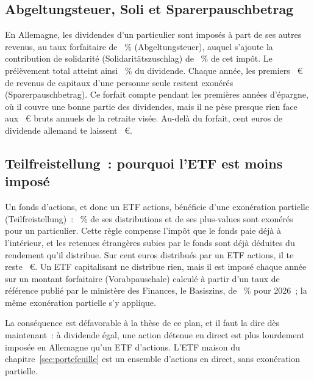 \subsection{Abgeltungsteuer, Soli et Sparerpauschbetrag}\label{sec:fisc-abgeltung}

En Allemagne, les dividendes d'un particulier sont impos\'es \`a part de ses autres revenus, au taux
forfaitaire de \AbgeltungSatz~\% (Abgeltungsteuer), auquel s'ajoute la
contribution de solidarit\'e (Solidarit\"atszuschlag) de \SoliSatz~\% de cet imp\^ot. Le
pr\'el\`evement total atteint ainsi \SteuerSatzGesamt~\% du dividende. Chaque ann\'ee, les premiers
\Sparerpauschbetrag~€ de revenus de capitaux d'une personne seule restent exon\'er\'es
(Sparerpauschbetrag). Ce forfait compte pendant les premi\`eres ann\'ees
d'\'epargne, o\`u il couvre une bonne partie des dividendes, mais il ne p\`ese presque rien face aux
\BruttoNoetig~€ bruts annuels de la retraite vis\'ee. Au-del\`a du forfait, cent euros de dividende
allemand te laissent \NettoDe~€.

\subsection{Teilfreistellung~: pourquoi l'ETF est moins impos\'e}\label{sec:fisc-teilfreistellung}

Un fonds d'actions, et donc un ETF actions, b\'en\'eficie d'une exon\'eration partielle
(Teilfreistellung)~: \Teilfreistellung~\% de ses distributions et de ses plus-values sont exon\'er\'es
pour un particulier. Cette r\`egle compense l'imp\^ot que le fonds
paie d\'ej\`a \`a l'int\'erieur, et les retenues \'etrang\`eres subies par le fonds sont d\'ej\`a
d\'eduites du rendement qu'il distribue. Sur cent euros distribu\'es par un ETF actions, il te reste
\NettoEtf~€. Un ETF capitalisant ne distribue rien, mais il est impos\'e chaque ann\'ee sur un montant
forfaitaire (Vorabpauschale) calcul\'e \`a partir d'un taux de r\'ef\'erence publi\'e par le
minist\`ere des Finances, le Basiszins, de \Basiszins~\% pour 2026~; la m\^eme
exon\'eration partielle s'y applique.

La cons\'equence est d\'efavorable \`a la th\`ese de ce plan, et il faut la dire d\`es maintenant~: \`a
dividende \'egal, une action d\'etenue en direct est plus lourdement impos\'ee en Allemagne qu'un ETF
d'actions. L'ETF maison du chapitre~\ref{sec:portefeuille} est un ensemble d'actions en direct, sans exon\'eration
partielle.

